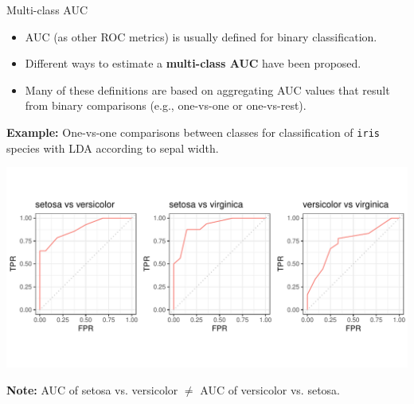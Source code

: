 \begin{vbframe}{Multi-class AUC}


\begin{itemize}
  \small
  \item AUC (as other ROC metrics) is usually defined for binary classification.
  \item Different ways to estimate a \textbf{multi-class AUC} have been proposed.
  \item Many of these definitions are based on aggregating AUC values
  that result from binary comparisons (e.g., one-vs-one or one-vs-rest).
\end{itemize}


\textbf{Example:} One-vs-one comparisons between classes for classification of \texttt{iris} species with LDA according to sepal width.

\centering
\includegraphics[trim = 0 40 -20 40, clip, width=\textwidth]{figure/eval_auc_extensions}

\textbf{Note:} AUC of setosa vs. versicolor $\neq$ AUC of versicolor vs. setosa.



\end{vbframe}
